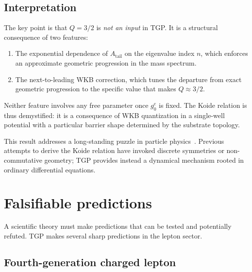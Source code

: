 \documentclass[11pt,a4paper]{article}
\newcommand{\gz}{g_0^e}
\newcommand{\Atail}{A_{\mathrm{tail}}}
\begin{document}
\subsection{Interpretation}

The key point is that $Q = 3/2$ is \emph{not an input} in TGP.
It is a structural consequence of two features:
\begin{enumerate}
  \item The exponential dependence of $\Atail$ on the eigenvalue
        index $n$, which enforces an approximate geometric progression
        in the mass spectrum.
  \item The next-to-leading WKB correction, which tunes the departure
        from exact geometric progression to the specific value that
        makes $Q \approx 3/2$.
\end{enumerate}
Neither feature involves any free parameter once $\gz$ is fixed.
The Koide relation is thus demystified: it is a consequence of
WKB quantization in a single-well potential with a particular
barrier shape determined by the substrate topology.

This result addresses a long-standing puzzle in particle
physics~\cite{Koide2007,Foot1994}.  Previous attempts to derive
the Koide relation have invoked discrete symmetries or
non-commutative geometry; TGP provides instead a dynamical
mechanism rooted in ordinary differential equations.

\section{Falsifiable predictions}\label{sec:predictions}

A scientific theory must make predictions that can be tested and
potentially refuted.  TGP makes several sharp predictions in the
lepton sector.

\subsection{Fourth-generation charged lepton}
\end{document}
